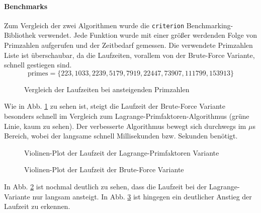 \paragraph{Benchmarks} Zum Vergleich der zwei Algorithmen wurde die \texttt{criterion} Benchmarking-Bibliothek verwendet.
Jede Funktion wurde mit einer größer werdenden Folge von Primzahlen aufgerufen und der Zeitbedarf gemessen. Die verwendete
Primzahlen Liste ist überschaubar, da die Laufzeiten, vorallem von der Brute-Force Variante, schnell gestiegen sind.
\[
    \text{primes} = \{223, 1033, 2239, 5179, 7919, 22447, 73907, 111799, 153913\}
\]
\begin{figure}[h]
    
    \caption{Vergleich der Laufzeiten bei ansteigenden Primzahlen}
    \label{fig:runtime_comparison}
\end{figure}
Wie in Abb. \ref{fig:runtime_comparison} zu sehen ist, steigt die Laufzeit der Brute-Force Variante besonders schnell
im Vergleich zum Lagrange-Primfaktoren-Algorithmus (grüne Linie, kaum zu sehen). Der verbesserte Algorithmus
bewegt sich durchwegs im $\mu$s Bereich, wobei der langsame schnell Millisekunden bzw. Sekunden benötigt.
\begin{figure}
    
    \caption{Violinen-Plot der Laufzeit der Lagrange-Primfaktoren Variante}
    \label{fig:violin_lagrange}
\end{figure}
\begin{figure}
    
    \caption{Violinen-Plot der Laufzeit der Brute-Force Variante}
    \label{fig:violin_brute_force}
\end{figure}
In Abb. \ref{fig:violin_lagrange} ist nochmal deutlich zu sehen, 
dass die Laufzeit bei der Lagrange-Variante nur langsam ansteigt.
In Abb. \ref{fig:violin_brute_force} ist hingegen ein deutlicher Anstieg der Laufzeit zu erkennen.